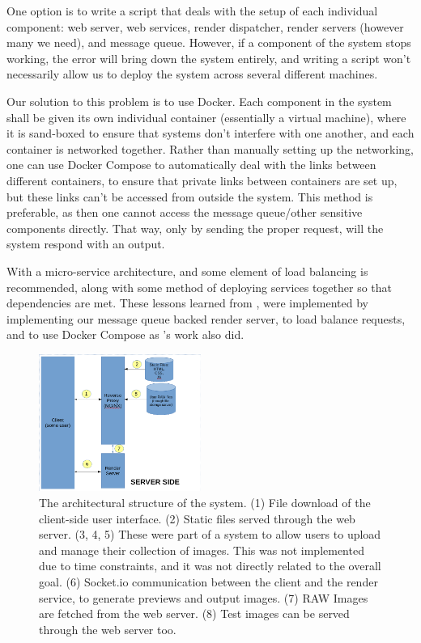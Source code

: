 \documentclass[10pt,a4paper]{article}
\begin{document}
One option is to write a script that deals with the setup of each individual component: web server, web services, render dispatcher, render servers (however many we need),
and message queue. However, if a component of the system stops working, the error will bring down the system entirely, and writing a script won't necessarily allow us to deploy the system
across several different machines.

Our solution to this problem is to use Docker. Each component in the system shall be given its own individual container (essentially a virtual machine), where
it is sand-boxed to ensure that systems don't interfere with one another, and each container is networked together. Rather than manually setting up the networking,
one can use Docker Compose to automatically deal with the links between different containers, to ensure that private links between containers are set up, but these links
can't be accessed from outside the system. This method is preferable, as then one cannot access the message queue/other sensitive components directly. That way, only by sending
the proper request, will the system respond with an output. 

With a micro-service architecture, and some element of load balancing is recommended, along with some method of deploying services together so that dependencies
are met. These lessons learned from \cite{Docker}, were implemented by implementing our message queue backed render server, to load balance requests,
and to use Docker Compose as \citeauthor{Docker}'s work also did.


\begin{figure}
\centering
\includegraphics[width=200px]{architecture}
\caption{The architectural structure of the system. (1) File download of the client-side user interface. (2) Static files served through the web server.
(3, 4, 5) These were part of a system to allow users to upload and manage their collection of images. This was not implemented due to time constraints, and it was not directly related to the overall goal. (6) Socket.io communication
between the client and the render service, to generate previews and output images. (7) RAW Images are fetched from the web server.  (8) Test images can be served through the web server too.}
\label{architecturediagram}
\end{figure}
\end{document}
